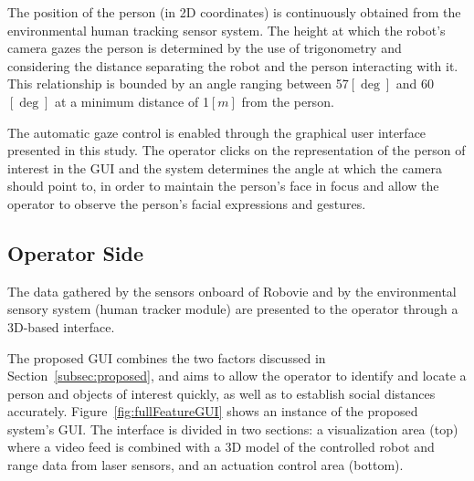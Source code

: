 \documentclass[journal]{IEEEtran}
\begin{document}

The position of the person (in 2D coordinates) is continuously obtained from the environmental human tracking sensor system. The height at which the robot's camera gazes the person is determined by the use of trigonometry and considering the distance separating the robot and the person interacting with it. This relationship is bounded by an angle ranging between 57$[\deg]$ and 60$[\deg]$ at a minimum distance of 1$[m]$ from the person.

The automatic gaze control is enabled through the graphical user interface presented in this study. The operator clicks on the representation of the person of interest in the GUI and the system determines the angle at which the camera should point to, in order to maintain the person's face in focus and allow the operator to observe the person's facial expressions and gestures. 

\subsection{Operator Side}
The data gathered by the sensors onboard of Robovie and by the environmental sensory system (human tracker module) are presented to the operator through a 3D-based interface.

The proposed GUI combines the two factors discussed in Section~\ref{subsec:proposed}, and aims to allow the operator to identify and locate a person and objects of interest quickly, as well as to establish social distances accurately.
Figure~\ref{fig:fullFeatureGUI} shows an instance of the proposed system's GUI. The interface is divided in two sections: a visualization area (top) where a video feed is combined with a 3D model of the controlled robot and range data from laser sensors, and an actuation control area (bottom).

\end{document}

